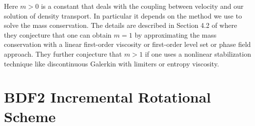 \documentclass[letterpaper]{erdc}
\begin{document}
\begin{remark}
  Here $m>0$ is a constant that deals with the coupling between velocity and our solution of density transport.  In particular it depends on the method we use to solve the mass conservation.  The details are described in Section 4.2 of \cite{guermond2011error} where they conjecture that one can obtain $m=1$ by approximating the mass conservation with a linear first-order viscosity or first-order level set or phase field approach.  They further conjecture that $m>1$ if one uses a nonlinear stabilization technique like discontinuous Galerkin with limiters or entropy viscosity.  
\end{remark}



%

\section{BDF2 Incremental Rotational Scheme}






\appendix
%
%
\end{document}
